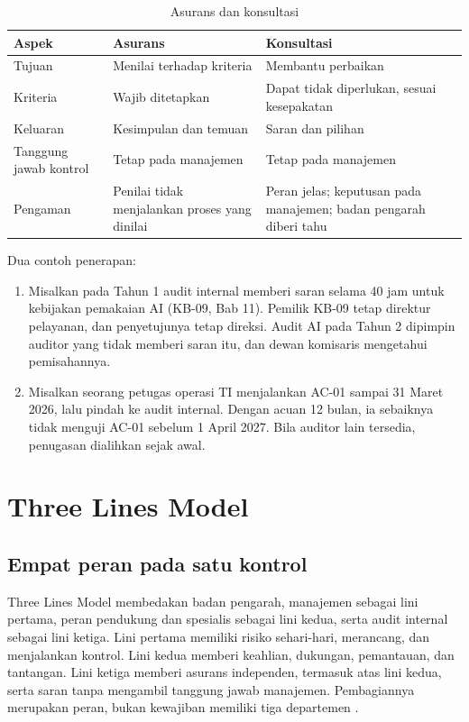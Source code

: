 \begin{table}[!htb]
  \centering\small
  \caption{Asurans dan konsultasi}\label{tab:ch12-asurans}
  \begin{tabularx}{\textwidth}{|>{\raggedright\arraybackslash}p{}|>{\raggedright\arraybackslash}X|>{\raggedright\arraybackslash}X|}
    \hline
    \textbf{Aspek} & \textbf{Asurans} & \textbf{Konsultasi} \\ \hline
    Tujuan & Menilai terhadap kriteria & Membantu perbaikan \\ \hline
    Kriteria & Wajib ditetapkan & Dapat tidak diperlukan, sesuai kesepakatan \\ \hline
    Keluaran & Kesimpulan dan temuan & Saran dan pilihan \\ \hline
    Tanggung jawab kontrol & Tetap pada manajemen & Tetap pada manajemen \\ \hline
    Pengaman & Penilai tidak menjalankan proses yang dinilai & Peran jelas; keputusan pada
    manajemen; badan pengarah diberi tahu \\ \hline
  \end{tabularx}
\end{table}

Dua contoh penerapan:
\begin{enumerate}
  \item Misalkan pada Tahun 1 audit internal memberi saran selama 40 jam untuk kebijakan
  pemakaian AI (KB-09, Bab 11). Pemilik KB-09 tetap direktur pelayanan, dan penyetujunya tetap
  direksi. Audit AI pada Tahun 2 dipimpin auditor yang tidak memberi saran itu, dan dewan
  komisaris mengetahui pemisahannya.
  \item Misalkan seorang petugas operasi TI menjalankan AC-01 sampai 31 Maret 2026, lalu pindah
  ke audit internal. Dengan acuan 12 bulan, ia sebaiknya tidak menguji AC-01 sebelum 1 April
  2027. Bila auditor lain tersedia, penugasan dialihkan sejak awal.
\end{enumerate}

\section{Three Lines Model}

\subsection*{Empat peran pada satu kontrol}

Three Lines Model membedakan badan pengarah, manajemen sebagai lini pertama, peran pendukung dan
spesialis sebagai lini kedua, serta audit internal sebagai lini ketiga. Lini pertama memiliki
risiko sehari-hari, merancang, dan menjalankan kontrol. Lini kedua memberi keahlian, dukungan,
pemantauan, dan tantangan. Lini ketiga memberi asurans independen, termasuk atas lini kedua,
serta saran tanpa mengambil tanggung jawab manajemen. Pembagiannya merupakan peran, bukan
kewajiban memiliki tiga departemen \cite{iia-tlm2026}.

